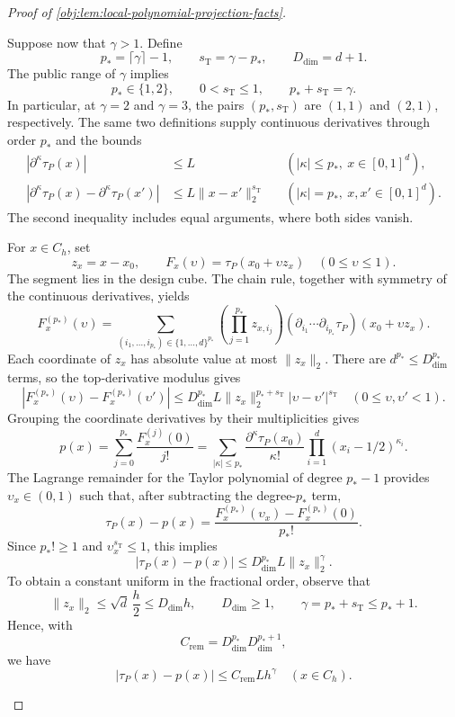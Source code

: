 \begin{proof}[Proof of \cref{obj:lem:local-polynomial-projection-facts}]
\begin{enumerate}
Suppose now that \(\gamma>1\). Define
\[
p_*=\lceil\gamma\rceil-1,\qquad
s_{\mathrm T}=\gamma-p_*,
\qquad
D_{\mathrm{dim}}=d+1.
\]
The public range of \(\gamma\) implies
\[
p_*\in\{1,2\},\qquad
0<s_{\mathrm T}\le1,\qquad
p_*+s_{\mathrm T}=\gamma.
\]
In particular, at \(\gamma=2\) and \(\gamma=3\), the pairs
\((p_*,s_{\mathrm T})\) are \((1,1)\) and \((2,1)\), respectively.
The same two definitions supply continuous derivatives through order \(p_*\) and the bounds
\[
\begin{aligned}
|\partial^\kappa\tau_P(x)|&\le L
&&(|\kappa|\le p_*,\ x\in[0,1]^d),\\
|\partial^\kappa\tau_P(x)-\partial^\kappa\tau_P(x')|
 &\le L\|x-x'\|_2^{s_{\mathrm T}}
&&(|\kappa|=p_*,\ x,x'\in[0,1]^d).
\end{aligned}
\]
The second inequality includes equal arguments, where both sides vanish.

For \(x\in C_h\), set
\[
z_x=x-x_0,\qquad
F_x(\upsilon)=\tau_P(x_0+\upsilon z_x)
\quad(0\le\upsilon\le1).
\]
The segment lies in the design cube. The chain rule, together with symmetry of the continuous derivatives, yields
\[
F_x^{(p_*)}(\upsilon)
 =
 \sum_{(i_1,\ldots,i_{p_*})\in\{1,\ldots,d\}^{p_*}}
 \left(\prod_{j=1}^{p_*}z_{x,i_j}\right)
 (\partial_{i_1}\cdots\partial_{i_{p_*}}\tau_P)
 (x_0+\upsilon z_x).
\]
Each coordinate of \(z_x\) has absolute value at most \(\|z_x\|_2\).
There are \(d^{p_*}\le D_{\mathrm{dim}}^{p_*}\) terms, so the top-derivative modulus gives
\[
\left|F_x^{(p_*)}(\upsilon)-F_x^{(p_*)}(\upsilon')\right|
 \le D_{\mathrm{dim}}^{p_*}L
       \|z_x\|_2^{p_*+s_{\mathrm T}}
       |\upsilon-\upsilon'|^{s_{\mathrm T}}
\quad(0\le\upsilon,\upsilon'<1).
\]
Grouping the coordinate derivatives by their multiplicities gives
\[
p(x)
 =\sum_{j=0}^{p_*}\frac{F_x^{(j)}(0)}{j!}
 =\sum_{|\kappa|\le p_*}
   \frac{\partial^\kappa\tau_P(x_0)}{\kappa!}
   \prod_{i=1}^d(x_i-1/2)^{\kappa_i}.
\]
The Lagrange remainder for the Taylor polynomial of degree \(p_*-1\)
provides \(\upsilon_x\in(0,1)\) such that, after subtracting the degree-\(p_*\) term,
\[
\tau_P(x)-p(x)
 =\frac{F_x^{(p_*)}(\upsilon_x)-F_x^{(p_*)}(0)}{p_*!}.
\]
Since \(p_*!\ge1\) and \(\upsilon_x^{s_{\mathrm T}}\le1\), this implies
\[
|\tau_P(x)-p(x)|
 \le D_{\mathrm{dim}}^{p_*}L\|z_x\|_2^\gamma.
\]
To obtain a constant uniform in the fractional order, observe that
\[
\|z_x\|_2\le\sqrt d\,\frac h2\le D_{\mathrm{dim}}h,
\qquad
D_{\mathrm{dim}}\ge1,
\qquad
\gamma=p_*+s_{\mathrm T}\le p_*+1.
\]
Hence, with
\[
C_{\mathrm{rem}}
 =D_{\mathrm{dim}}^{p_*}D_{\mathrm{dim}}^{p_*+1},
\]
we have
\[
|\tau_P(x)-p(x)|
 \le C_{\mathrm{rem}}Lh^\gamma
 \quad(x\in C_h).
\]


\end{enumerate}
\end{proof}
